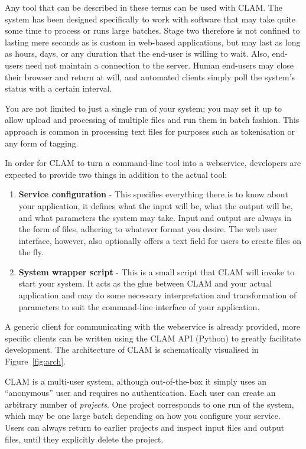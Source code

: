 \documentclass[11pt]{article}
\begin{document}
Any tool that can be described in these terms can be used with CLAM. The system
has been designed specifically to work with software that may take quite some
time to process or runs large batches. Stage two therefore is not confined to
lasting mere seconds as is custom in web-based applications, but may last as
long as hours, days, or any duration that the end-user is willing to wait.
Also, end-users need not maintain a connection to the server. Human end-users
may close their browser and return at will, and automated clients simply poll the
system's status with a certain interval.

You are not limited to just a single run of your system; you may set it up to
allow upload and processing of multiple files and run them in batch fashion.
This approach is common in processing text files for purposes such as
tokenisation or any form of tagging.

In order for CLAM to turn a command-line tool into a webservice, developers are
expected to provide two things in addition to the actual tool: 

\begin{enumerate}
  \item \textbf{Service configuration} - This specifies everything there is to
    know about your application, it defines what the input will be, what
    the output will be, and what parameters the system may take. Input and output
    are always in the form of files, adhering to whatever format you desire. The web user interface, however, also
    optionally offers a text field for users to create files on the fly. 
    
  \item \textbf{System wrapper script} - This is a small script that CLAM will
    invoke to start your system. It acts as the glue between CLAM and your
    actual application and may do some necessary interpretation and
    transformation of parameters to suit the command-line interface of your
    application.
\end{enumerate}


A generic client for communicating with the webservice is already provided,
more specific clients can be written using the CLAM API (Python) to greatly
facilitate development. The architecture of CLAM is schematically visualised in
Figure~\ref{fig:arch}.

CLAM is a multi-user system, although out-of-the-box it simply uses an
``anonymous'' user and requires no authentication. Each user can create an
arbitrary number of \emph{projects}. One project corresponds to one run of the
system, which may be one large batch depending on how you configure your
service. Users can always return to earlier projects and inspect input files
and output files, until they explicitly delete the project.
\end{document}
